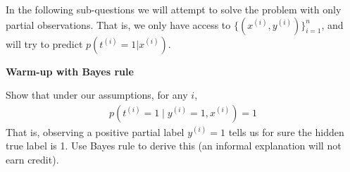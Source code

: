 \vspace{0.3in}
In the following sub-questions we will attempt to solve the problem with only partial observations. That is, we only have access to $\{(x^{(i)}, y^{(i)})\}_{i=1}^n$, and will try to predict $p(t^{(i)}=1 | x^{(i)})$.

\item {} \textbf{Warm-up with Bayes rule}

Show that under our assumptions, for any $i$, 
\begin{align}
p(t^{(i)}=1\mid y^{(i)} = 1, x^{(i)}) = 1
\end{align}
That is, observing a positive partial label $y^{(i)}=1$ tells us for sure the hidden true label is 1. Use Bayes rule to derive this (an informal explanation will not earn credit).

